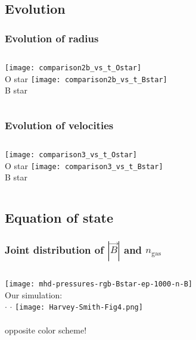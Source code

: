 \documentclass[presentation]{beamer}
\begin{document}
\subsection{Evolution}



\begin{frame}
  \frametitle{Evolution of radius}
  \begin{columns}
    \centering
    \texttt{[image: comparison2b\_vs\_t\_Ostar]}\\
    O star
    \centering
    \texttt{[image: comparison2b\_vs\_t\_Bstar]}\\
    B star
  \end{columns}
  
\end{frame}

\begin{frame}
  \frametitle{Evolution of velocities}
  \begin{columns}
    \centering
    \texttt{[image: comparison3\_vs\_t\_Ostar]}\\
    O star
    \centering
    \texttt{[image: comparison3\_vs\_t\_Bstar]}\\
    B star
  \end{columns}
  
\end{frame}

\subsection{Equation of state}

\begin{frame}
  \frametitle{Joint distribution of \(|\vec{B}|\) and \(n_{\mathrm{gas}}\)}
  \begin{columns}
    \centering
    \texttt{[image: mhd-pressures-rgb-Bstar-ep-1000-n-B]}\\
    Our simulation:\\ \color{red}{molecular} \(\cdot\) \color{green}{neutral} \(\cdot\) \color{blue}{ionized} 
    \centering
    \texttt{[image: Harvey-Smith-Fig4.png]}\\
    \\
    opposite color scheme!
  \end{columns}
  

\end{frame}
\end{document}
